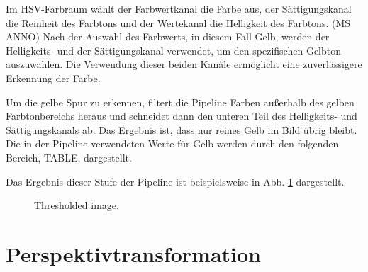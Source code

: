 \documentclass[arbeit=studie,oneside,BCOR=12mm]{ArbeitRST}
\begin{document}
Im HSV-Farbraum wählt der Farbwertkanal die Farbe aus, der Sättigungskanal die
Reinheit des Farbtons und der Wertekanal die Helligkeit des Farbtons. (MS ANNO)
Nach der Auswahl des Farbwerts, in diesem Fall Gelb, werden der Helligkeits-
und der Sättigungskanal verwendet, um den spezifischen Gelbton auszuwählen. Die
Verwendung dieser beiden Kanäle ermöglicht eine zuverlässigere Erkennung der
Farbe.

Um die gelbe Spur zu erkennen, filtert die Pipeline Farben außerhalb des gelben
Farbtonbereichs heraus und schneidet dann den unteren Teil des Helligkeits- und
Sättigungskanals ab. Das Ergebnis ist, dass nur reines Gelb im Bild übrig
bleibt. Die in der Pipeline verwendeten Werte für Gelb werden durch den
folgenden Bereich, TABLE, dargestellt.

Das Ergebnis dieser Stufe der Pipeline ist beispielsweise in Abb. \ref{color-thresholding}
dargestellt. \\

\begin{figure}[h]
    \centering
    \caption{Thresholded image.}
    \label{color-thresholding}
\end{figure}

\section{Perspektivtransformation}
\end{document}
